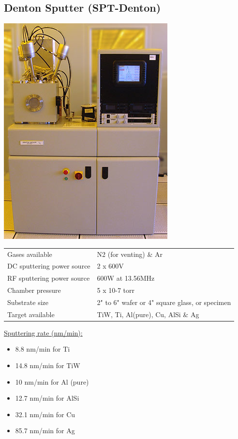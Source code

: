 \subsection{Denton Sputter (SPT-Denton)}\label{denton_sputter_machine}

\begin{minipage}[H]{\MachinePictureMiniPageWidth}
	\includegraphics[width=\MachinePictureWidth]{pictures_machines/denton_sputter.png}
\end{minipage}\begin{minipage}[H]{\MachineTextMiniPageWidth}
	\begin{tabular}{|p{3cm}|p{8cm}|}
		\hline
		Gases available &
		N2 (for venting) \& Ar \\
		DC sputtering power source &
		2 x 600V \\
		RF sputtering power source &
		600W at 13.56MHz \\
		Chamber pressure &
		5 x 10-7 torr \\
		Substrate size &
		2" to 6" wafer or 4" square glass, or specimen \\
		Target available &
		TiW, Ti, Al(pure), Cu, AlSi \& Ag \\
		\hline
	\end{tabular}

	\underline{Sputtering rate (nm/min):}
	
	\begin{itemize}
		\item 8.8 nm/min for Ti
		\item 14.8 nm/min for TiW
		\item 10 nm/min for Al (pure)
		\item 12.7 nm/min for AlSi
		\item 32.1 nm/min for Cu
		\item 85.7 nm/min for Ag	
	\end{itemize}

\end{minipage}